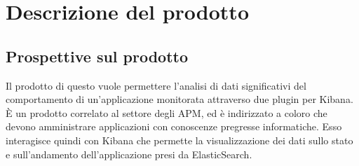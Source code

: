 \newpage
\section{Descrizione del prodotto} \label{descrizione}
	\subsection{Prospettive sul prodotto}
	Il prodotto di questo  vuole permettere l'analisi di dati significativi del comportamento di un'applicazione monitorata attraverso due plugin per Kibana.
	È un prodotto correlato al settore degli APM, ed è indirizzato a coloro che devono amministrare applicazioni con conoscenze pregresse informatiche. Esso interagisce quindi con Kibana che permette la visualizzazione dei dati sullo stato e sull'andamento dell'applicazione presi da ElasticSearch.
